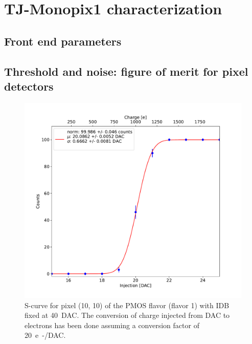 
\section{TJ-Monopix1 characterization}
    \subsection{Front end parameters}


    \subsection{Threshold and noise: figure of merit for pixel detectors}
        \begin{figure}[h!]
            \centering
            \includegraphics[width=.6\linewidth]{figures/charaterization/scurve.pdf}
            \caption{S-curve for pixel (10, 10) of the PMOS flavor (flavor 1) with IDB fixed at \SI{40}{DAC}. The conversion of charge injected from DAC to electrons has been done assuming a conversion factor of \SI{20}{e-/DAC}. }
            \label{fig:scurve}
        \end{figure}   

